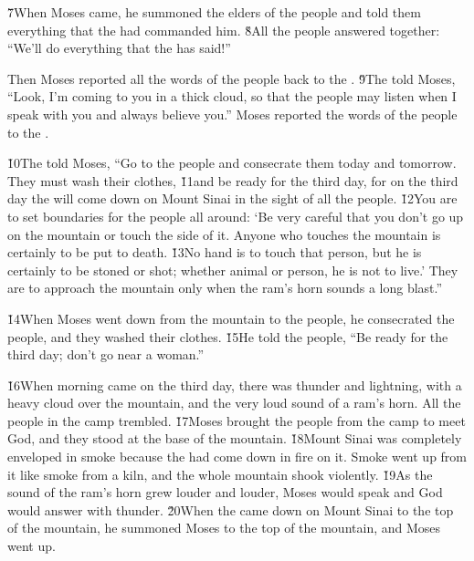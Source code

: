 \v{7}When Moses came, he summoned the elders of the people and told them everything that the  had commanded him. \v{8}All the people answered together: ``We'll do everything that the  has said!''

Then Moses reported all the words of the people back to the . \v{9}The  told Moses, ``Look, I'm coming to you in a thick cloud, so that the people may listen when I speak with you and always believe you.'' Moses reported the words of the people to the .

\v{10}The  told Moses, ``Go to the people and consecrate them today and tomorrow. They must wash their clothes, \v{11}and be ready for the third day, for on the third day the  will come down on Mount Sinai in the sight of all the people. \v{12}You are to set boundaries for the people all around: `Be very careful that you don't go up on the mountain or touch the side of it. Anyone who touches the mountain is certainly to be put to death. \v{13}No hand is to touch that person, but he is certainly to be stoned or shot; whether animal or person, he is not to live.' They are to approach the mountain only when the ram's horn sounds a long blast.''

\v{14}When Moses went down from the mountain to the people, he consecrated the people, and they washed their clothes. \v{15}He told the people, ``Be ready for the third day; don't go near a woman.''

\v{16}When morning came on the third day, there was thunder and lightning, with a heavy cloud over the mountain, and the very loud sound of a ram's horn. All the people in the camp trembled. \v{17}Moses brought the people from the camp to meet God, and they stood at the base of the mountain. \v{18}Mount Sinai was completely enveloped in smoke because the  had come down in fire on it. Smoke went up from it like smoke from a kiln, and the whole mountain shook violently. \v{19}As the sound of the ram's horn grew louder and louder, Moses would speak and God would answer with thunder. \v{20}When the  came down on Mount Sinai to the top of the mountain, he summoned Moses to the top of the mountain, and Moses went up.

